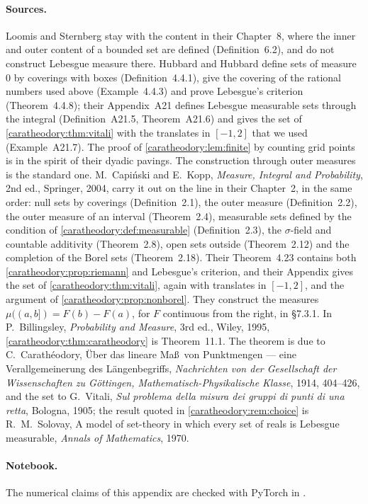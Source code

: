 \begin{notechapter}
\paragraph{Sources.} Loomis and Sternberg stay with the content in
their Chapter~8, where the inner and outer content of a bounded set
are defined (Definition~6.2), and do not construct Lebesgue measure
there. Hubbard and
Hubbard define sets of measure $0$ by coverings with boxes
(Definition~4.4.1), give the covering of the rational numbers used
above (Example~4.4.3) and prove Lebesgue's criterion
(Theorem~4.4.8); their Appendix~A21 defines Lebesgue measurable sets
through the integral (Definition~A21.5, Theorem~A21.6) and gives the
set of \cref{caratheodory:thm:vitali} with the translates in
$[-1, 2]$ that we used (Example~A21.7). The proof of
\cref{caratheodory:lem:finite} by counting grid points is in the
spirit of their dyadic pavings. The construction through outer
measures is the standard one. M.~Capi\'nski and E.~Kopp,
\emph{Measure, Integral and Probability}, 2nd ed., Springer, 2004,
carry it out on the line in their Chapter~2, in the same order: null
sets by coverings (Definition~2.1), the outer measure
(Definition~2.2), the outer measure of an interval (Theorem~2.4),
measurable sets defined by the condition of
\cref{caratheodory:def:measurable} (Definition~2.3), the
$\sigma$-field and countable additivity (Theorem~2.8), open sets
outside (Theorem~2.12) and the completion of the Borel sets
(Theorem~2.18). Their Theorem~4.23 contains both
\cref{caratheodory:prop:riemann} and Lebesgue's criterion, and their
Appendix gives the set of \cref{caratheodory:thm:vitali}, again with
translates in $[-1, 2]$, and the argument of
\cref{caratheodory:prop:nonborel}. They construct the measures
$\mu((a, b]) = F(b) - F(a)$, for $F$ continuous from the right, in
\S7.3.1. In P.~Billingsley, \emph{Probability and Measure}, 3rd ed.,
Wiley, 1995, \cref{caratheodory:thm:caratheodory} is Theorem~11.1.
The theorem is due to C.~Carath\'eodory, \"Uber das lineare Ma\ss\ von
Punktmengen --- eine Verallgemeinerung des L\"angenbegriffs,
\emph{Nachrichten von der Gesellschaft der Wissenschaften zu
G\"ottingen, Mathematisch-Physikalische Klasse}, 1914, 404--426, and
the set to G.~Vitali, \emph{Sul problema della misura dei gruppi di
punti di una retta}, Bologna, 1905; the result quoted in
\cref{caratheodory:rem:choice}
is R.~M.~Solovay, A model of set-theory in which every set of reals is
Lebesgue measurable, \emph{Annals of Mathematics}, 1970.

\paragraph{Notebook.} The numerical claims of this appendix are checked
with PyTorch in .


\end{notechapter}
